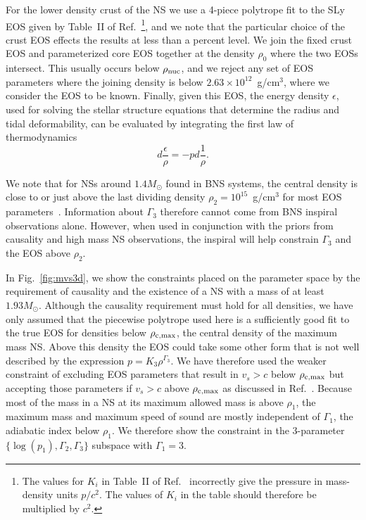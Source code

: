 \documentclass[twocolumn,prd,amssymb,aps,nofootinbib,showpacs,epsf]{revtex4}
\begin{document}
For the lower density crust of the NS we use a 4-piece polytrope fit to the SLy EOS given by Table~II of Ref.~\cite{ReadLackey2009}\footnote{The values for $K_i$ in Table~II of Ref.~\cite{ReadLackey2009} incorrectly give the pressure in mass-density units $p/c^2$. The values of $K_i$ in the table should therefore be multiplied by $c^2$.}, and we note that the particular choice of the crust EOS effects the results at less than a percent level. We join the fixed crust EOS and parameterized core EOS together at the density $\rho_0$ where the two EOSs intersect. This usually occurs below $\rho_{\rm nuc}$, and we reject any set of EOS parameters where the joining density is below $2.63\times 10^{12}$~g/cm$^3$, where we consider the EOS to be known. Finally, given this EOS, the energy density $\epsilon$, used for solving the stellar structure equations that determine the radius and tidal deformability, can be evaluated by integrating the first law of thermodynamics
\begin{equation}
d\frac{\epsilon}{\rho} = - p d\frac{1}{\rho}.
\end{equation}

We note that for NSs around $1.4M_\odot$ found in BNS systems, the central density is close to or just above the last dividing density $\rho_2 = 10^{15}$~g/cm$^3$ for most EOS parameters~\cite{ReadLackey2009}. Information about $\Gamma_3$ therefore cannot come from BNS inspiral observations alone. However, when used in conjunction with the priors from causality and high mass NS observations, the inspiral will help constrain $\Gamma_3$ and the EOS above $\rho_2$.

In Fig.~\ref{fig:mvs3d}, we show the constraints placed on the parameter space by the requirement of causality and the existence of a NS with a mass of at least $1.93M_\odot$. Although the causality requirement must hold for all densities, we have only assumed that the piecewise polytrope used here is a sufficiently good fit to the true EOS for densities below $\rho_{\rm c, max}$, the central density of the maximum mass NS. Above this density the EOS could take some other form that is not well described by the expression $p = K_3 \rho^{\Gamma_3}$. We have therefore used the weaker constraint of excluding EOS parameters that result in $v_s > c$ below $\rho_{\rm c, max}$ but accepting those parameters if $v_s > c$ above $\rho_{\rm c, max}$ as discussed in Ref.~\cite{ReadLackey2009}. Because most of the mass in a NS at its maximum allowed mass is above $\rho_1$, the maximum mass and maximum speed of sound are mostly independent of $\Gamma_1$, the adiabatic index below $\rho_1$. We therefore show the constraint in the 3-parameter $\{\log(p_1), \Gamma_2, \Gamma_3\}$ subspace with $\Gamma_1=3$. 
\end{document}
